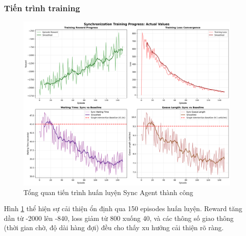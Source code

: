 \subsubsection{Tiến trình training}

\begin{figure}[!htp]
    \centering
    \includegraphics[width=\textwidth]{figures/training_overview.png}
    \caption{Tổng quan tiến trình huấn luyện Sync Agent thành công}
    \label{fig:sync_training_overview}
\end{figure}

Hình \ref{fig:sync_training_overview} thể hiện sự cải thiện ổn định qua 150 episodes huấn luyện. Reward tăng dần từ -2000 lên -840, loss giảm từ 800 xuống 40, và các thông số giao thông (thời gian chờ, độ dài hàng đợi) đều cho thấy xu hướng cải thiện rõ ràng.




